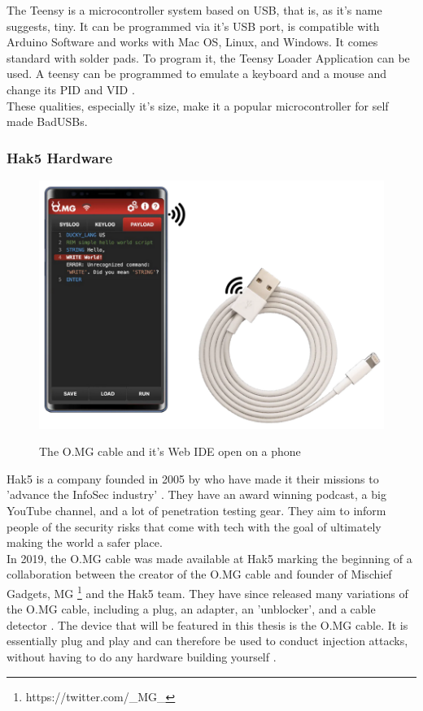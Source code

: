 The Teensy  \cite{TeensyUSBDevelopment} is a microcontroller system based on USB, that is, as it's name suggests, tiny. It can be programmed via it's USB port, is compatible with Arduino Software and works with Mac OS, Linux, and Windows. It comes standard with solder pads. To program it, the Teensy Loader Application can be used.
A teensy can be programmed to emulate a keyboard and a mouse and change its PID and VID \cite{farhiMalboardNovelUser2019}.\\
These qualities, especially it's size, make it a popular microcontroller for self made BadUSBs. 


\subsubsection{Hak5 Hardware} \label{Hak5Hardware}

\begin{figure}[H]
    \centering
    \includegraphics[width=0.5\linewidth]{OMGCable.png}
    \caption{The O.MG cable and it's Web IDE open on a phone}
    \label{fig:OMGCable}
    \cite{hak5MGCable}
\end{figure}

Hak5 is a company founded in 2005 by who have made it their missions to 'advance the InfoSec industry' \cite{hak5}. They have an award winning podcast, a big YouTube channel, and a lot of penetration testing gear. They aim to inform people of the security risks that come with tech with the goal of ultimately making the world a safer place. \\
In 2019, the O.MG cable was made available at Hak5 \cite{MGCable2019a} marking the beginning of a collaboration between the creator of the O.MG cable and founder of Mischief Gadgets, MG \footnote{https://twitter.com/_MG_} and the Hak5 team. They have since released many variations of the O.MG cable, including a plug, an adapter, an 'unblocker', and a cable detector \cite{hak5MischiefGadgets}. The device that will be featured in this thesis is the O.MG cable. It is essentially plug and play and can therefore be used to conduct injection attacks, without having to do any hardware building yourself \cite{hak5MGCable}. 



